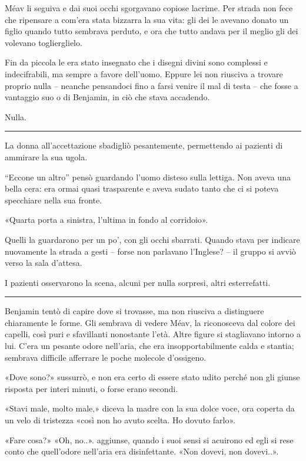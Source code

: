 \documentclass[a4paper,11pt,oneside,openright,final]{memoir}
\begin{document}
Méav li seguiva e dai suoi occhi sgorgavano copiose lacrime. Per strada non
fece che ripensare a com'era stata bizzarra la sua vita: gli dei le avevano
donato un figlio quando tutto sembrava perduto, e ora che tutto andava per il
meglio gli dei volevano toglierglielo.

Fin da piccola le era stato insegnato che i disegni divini sono complessi e
indecifrabili, ma sempre a favore dell'uomo. Eppure lei non riusciva a trovare
proprio nulla -- neanche pensandoci fino a farsi venire il mal di testa -- che
fosse a vantaggio suo o di Benjamin, in ciò che stava accadendo.

Nulla.

\plainbreak{1}

La donna all'accettazione sbadigliò pesantemente, permettendo ai pazienti di
ammirare la sua ugola.

``Eccone un altro'' pensò guardando l'uomo disteso sulla lettiga. Non aveva
una bella cera: era ormai quasi trasparente e aveva sudato tanto che ci si
poteva specchiare nella sua fronte.

«Quarta porta a sinistra, l'ultima in fondo al corridoio».

Quelli la guardarono per un po', con gli occhi sbarrati. Quando stava per
indicare nuovamente la strada a gesti -- forse non parlavano l'Inglese? -- il
gruppo si avviò verso la sala d'attesa.

I pazienti osservarono la scena, alcuni per nulla sorpresi, altri esterrefatti.

\plainbreak{1}

Benjamin tentò di capire dove si trovasse, ma non riusciva a distinguere
chiaramente le forme. Gli sembrava di vedere Méav, la riconosceva dal colore
dei capelli, così puri e sfavillanti nonostante l'età. Altre figure si
stagliavano intorno a lui. C'era un pesante odore nell'aria, che era
insopportabilmente calda e stantia; sembrava difficile afferrare le poche
molecole d'ossigeno.

«Dove sono?» sussurrò, e non era certo di essere stato udito perché non gli
giunse risposta per interi minuti, o forse erano secondi.

«Stavi male, molto male,» diceva la madre con la sua dolce voce, ora coperta
da un velo di tristezza «così non ho avuto scelta. Ho dovuto farlo».

«Fare cosa?» «Oh, no..». aggiunse, quando i suoi sensi si acuirono ed egli
si rese conto che quell'odore nell'aria era disinfettante. «Non dovevi, non
dovevi..».
\end{document}
